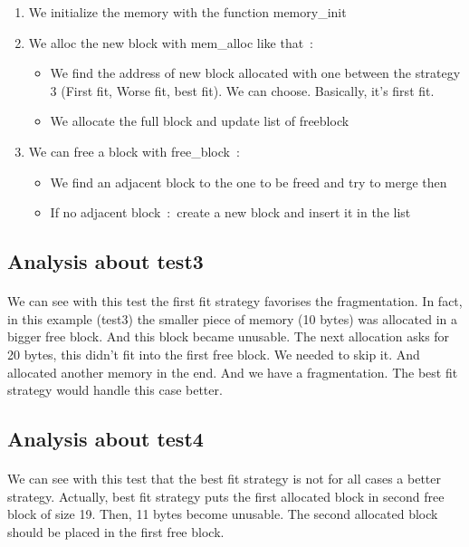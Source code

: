 \documentclass[a4paper,10pt]{article}
\begin{document}
\begin{enumerate}
\item We initialize the memory with the function memory\_init
\item We alloc the new block with mem\_alloc like that~:
	\begin{itemize}
	\item We find the address of new block allocated with one between
	 the strategy 3
	(First fit, Worse fit, best fit). We can choose. Basically, it's first fit.
	\item We allocate the full block and update list of freeblock
	\end{itemize}
\item We can free a block with free\_block~:
	\begin{itemize}
	\item We find an adjacent block to the one to be freed and try to merge then
	\item If no adjacent block~:~create a new block and insert it in the list
	\end{itemize}
\end{enumerate}

\subsection{Analysis about test3}
\paragraph{}
We can see with this test the first fit strategy favorises the fragmentation.
In fact, in this example (test3) the smaller piece of memory (10 bytes) was
allocated in a bigger free block. And this block became unusable. 
The next allocation asks for 20 bytes, this didn't fit into the first 
free block. We needed to skip it. And allocated another memory in the end.
And we have a fragmentation. 
The best fit strategy would handle this case better.

\subsection{Analysis about test4}
\paragraph{}
We can see with this test that the best fit strategy is not for all 
cases a better strategy. Actually, best fit strategy puts the first 
allocated block in second free block of size 19. Then, 11 bytes become unusable. The second allocated block should be placed in the first 
free block. 
\end{document}
